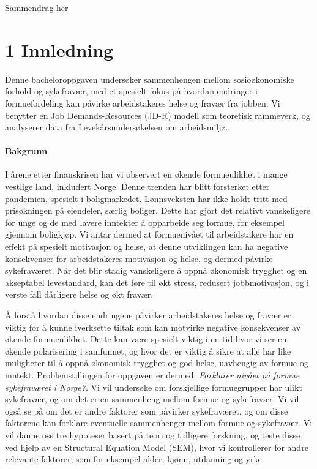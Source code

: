 \documentclass[
  12pt,
  a4paper,
  DIV=11,
  numbers=noendperiod]{scrartcl}
\let\oldparagraph\paragraph
\renewcommand{\paragraph}[1]{\oldparagraph{#1}\mbox{}}
\begin{document}
Sammendrag her



\newpage

\section{1 Innledning}\label{innledning}

Denne bacheloroppgaven undersøker sammenhengen mellom sosioøkonomiske
forhold og sykefravær, med et spesielt fokus på hvordan endringer i
formuefordeling kan påvirke arbeidstakeres helse og fravær fra jobben.
Vi benytter en Job Demands-Resources (JD-R) modell som teoretisk
rammeverk, og analyserer data fra Levekårsundersøkelsen om arbeidsmiljø.

\paragraph{Bakgrunn}\label{bakgrunn}

I årene etter finanskrisen har vi observert en økende formueulikhet i
mange vestlige land, inkludert Norge. Denne trenden har blitt forsterket
etter pandemien, spesielt i boligmarkedet. Lønnsveksten har ikke holdt
tritt med prisøkningen på eiendeler, særlig boliger. Dette har gjort det
relativt vanskeligere for unge og de med lavere inntekter å opparbeide
seg formue, for eksempel gjennom boligkjøp. Vi antar dermed at
formuenivået til arbeidstakere har en effekt på spesielt motivasjon og
helse, at denne utviklingen kan ha negative konsekvenser for
arbeidstakeres motivasjon og helse, og dermed påvirke sykefraværet. Når
det blir stadig vanskeligere å oppnå økonomisk trygghet og en akseptabel
levestandard, kan det føre til økt stress, redusert jobbmotivasjon, og i
verste fall dårligere helse og økt fravær.

Å forstå hvordan disse endringene påvirker arbeidstakeres helse og
fravær er viktig for å kunne iverksette tiltak som kan motvirke negative
konsekvenser av økende formueulikhet. Dette kan være spesielt viktig i
en tid hvor vi ser en økende polarisering i samfunnet, og hvor det er
viktig å sikre at alle har like muligheter til å oppnå økonomisk
trygghet og god helse, uavhengig av formue og inntekt. Problemstillingen
for oppgaven er dermed: \emph{Forklarer nivået på formue sykefraværet i
Norge?}. Vi vil undersøke om forskjellige formuegrupper har ulikt
sykefravær, og om det er en sammenheng mellom formue og sykefravær. Vi
vil også se på om det er andre faktorer som påvirker sykefraværet, og om
disse faktorene kan forklare eventuelle sammenhenger mellom formue og
sykefravær. Vi vil danne oss tre hypoteser basert på teori og tidligere
forskning, og teste disse ved hjelp av en Structural Equation Model
(SEM), hvor vi kontrollerer for andre relevante faktorer, som for
eksempel alder, kjønn, utdanning og yrke.
\end{document}

